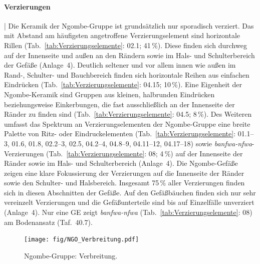 \paragraph{Verzierungen}\hspace{-.5em}|\hspace{.5em}%
Die Keramik der Ngombe-Gruppe ist grundsätzlich nur sporadisch verziert. Das mit Abstand am häufigsten angetroffene Verzierungselement sind horizontale Rillen (Tab.~\ref{tab:Verzierungselemente}: 02.1; 41\,\%). Diese finden sich durchweg auf der Innenseite und außen an den Rändern sowie im Hals- und Schulterbereich der Gefäße (Anlage~4). Deutlich seltener und vor allem innen wie außen im Rand-, Schulter- und Bauchbereich finden sich horizontale Reihen aus einfachen Eindrücken (Tab.~\ref{tab:Verzierungselemente}: 04.15; 10\,\%). Eine Eigenheit der Ngombe-Keramik sind Gruppen aus kleinen, halbrunden Eindrücken beziehungsweise Einkerbungen, die fast ausschließlich an der Innenseite der Ränder zu finden sind (Tab.~\ref{tab:Verzierungselemente}: 04.5; 8\,\%). Des Weiteren umfasst das Spektrum an Verzierungselementen der Ngombe-Gruppe eine breite Palette von Ritz- oder Eindruckelementen (Tab.~\ref{tab:Verzierungselemente}: 01.1--3, 01.6, 01.8, 02.2--3, 02.5, 04.2--4, 04.8--9, 04.11--12, 04.17--18) sowie \textit{banfwa-nfwa}-Verzierungen (Tab.~\ref{tab:Verzierungselemente}: 08; 4\,\%) auf der Innenseite der Ränder sowie im Hals- und Schulterbereich (Anlage~4). Die Ngombe-Gefäße zeigen eine klare Fokussierung der Verzierungen auf die Innenseite der Ränder sowie den Schulter- und Halsbereich. Insgesamt 75\,\% aller Verzierungen finden sich in diesen Abschnitten der Gefäße. Auf den Gefäßbäuchen finden sich nur sehr vereinzelt Verzierungen und die Gefäßunterteile sind bis auf Einzelfälle unverziert (\mbox{Anlage}~4). Nur eine GE zeigt \textit{banfwa-nfwa} (Tab.~\ref{tab:Verzierungselemente}: 08) am Bodenansatz (Taf.~40.7).

\begin{figure}[p]
	\centering
	\texttt{[image: fig/NGO\_Verbreitung.pdf]}
	\caption{Ngombe-Gruppe: Verbreitung.}
	\label{fig:NGO_Verbreitung}
\end{figure}


